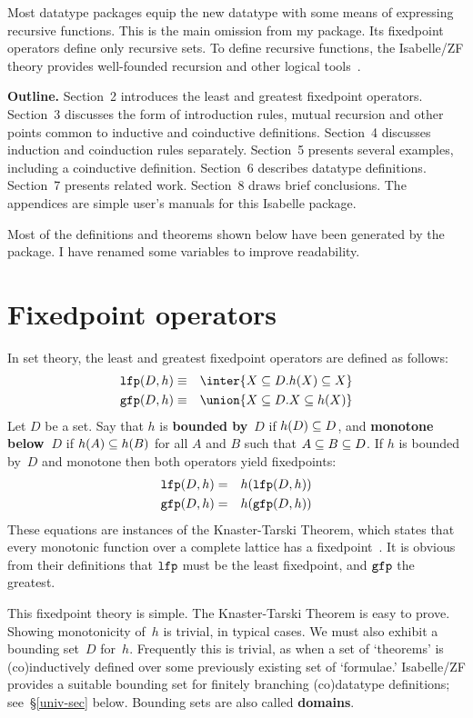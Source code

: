 Most datatype packages equip the new datatype with some means of expressing
recursive functions.  This is the main omission from my package.  Its
fixedpoint operators define only recursive sets.  To define recursive
functions, the Isabelle/ZF theory provides well-founded recursion and other
logical tools~\cite{paulson-set-II}.

{\bf Outline.} Section~2 introduces the least and greatest fixedpoint
operators.  Section~3 discusses the form of introduction rules, mutual
recursion and other points common to inductive and coinductive definitions.
Section~4 discusses induction and coinduction rules separately.  Section~5
presents several examples, including a coinductive definition.  Section~6
describes datatype definitions.  Section~7 presents related work.
Section~8 draws brief conclusions.  \ifCADE\else The appendices are simple
user's manuals for this Isabelle package.\fi

Most of the definitions and theorems shown below have been generated by the
package.  I have renamed some variables to improve readability.
 
\section{Fixedpoint operators}
In set theory, the least and greatest fixedpoint operators are defined as
follows:
\begin{eqnarray*}
   \lfp(D,h)  & \equiv & \inter\{X\sbs D. h(X)\sbs X\} \\
   \gfp(D,h)  & \equiv & \union\{X\sbs D. X\sbs h(X)\}
\end{eqnarray*}   
Let $D$ be a set.  Say that $h$ is {\bf bounded by}~$D$ if $h(D)\subseteq D$, and
{\bf monotone below~$D$} if
$h(A)\subseteq h(B)$ for all $A$ and $B$ such that $A\subseteq B\subseteq D$.  If $h$ is
bounded by~$D$ and monotone then both operators yield fixedpoints:
\begin{eqnarray*}
   \hbox{\tt lfp}(D,h)  & = & h(\hbox{\tt lfp}(D,h)) \\
   \hbox{\tt gfp}(D,h)  & = & h(\hbox{\tt gfp}(D,h)) 
\end{eqnarray*}   
These equations are instances of the Knaster-Tarski Theorem, which states
that every monotonic function over a complete lattice has a
fixedpoint~\cite{davey&priestley}.  It is obvious from their definitions
that  $\hbox{\tt lfp}$ must be the least fixedpoint, and $\hbox{\tt gfp}$ the greatest.

This fixedpoint theory is simple.  The Knaster-Tarski Theorem is easy to
prove.  Showing monotonicity of~$h$ is trivial, in typical cases.  We must
also exhibit a bounding set~$D$ for~$h$.  Frequently this is trivial, as
when a set of `theorems' is (co)inductively defined over some previously
existing set of `formulae.'  Isabelle/ZF provides a suitable bounding set
for finitely branching (co)datatype definitions; see~\S\ref{univ-sec}
below.  Bounding sets are also called {\bf domains}.

